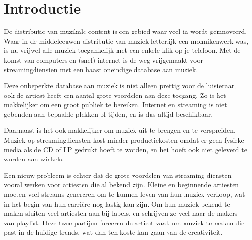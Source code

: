 \section{Introductie}

De distributie van muzikale content is een gebied waar veel in wordt geïnnoveerd. Waar in de middeleeuwen distributie van muziek letterlijk een monnikenwerk was, is nu vrijwel alle muziek toegankelijk met een enkele klik op je telefoon. Met de komst van computers en (snel) internet is de weg vrijgemaakt voor streamingdiensten met een haast oneindige database aan muziek.

Deze onbeperkte database aan muziek is niet alleen prettig voor de luisteraar, ook de artiest heeft een aantal grote voordelen aan deze toegang. Zo is het makkelijker om een groot publiek te bereiken. Internet en streaming is niet gebonden aan bepaalde plekken of tijden, en is dus altijd beschikbaar.

Daarnaast is het ook makkelijker om muziek uit te brengen en te verspreiden. Muziek op streamingdiensten kost minder productiekosten omdat er geen fysieke media als de CD of LP gedrukt hoeft te worden, en het hoeft ook niet geleverd te worden aan winkels.

Een nieuw probleem is echter dat de grote voordelen van streaming diensten vooral werken voor artiesten die al bekend zijn. Kleine en beginnende artiesten moeten veel streams genereren om te kunnen leven van hun muziek verkoop, wat in het begin van hun carrière nog lastig kan zijn. Om hun muziek bekend te maken sluiten veel artiesten aan bij labels, en schrijven ze veel naar de makers van playlist. Deze twee partijen forceren de artiest vaak om muziek te maken die past in de huidige trends, wat dan ten koste kan gaan van de creativiteit.

